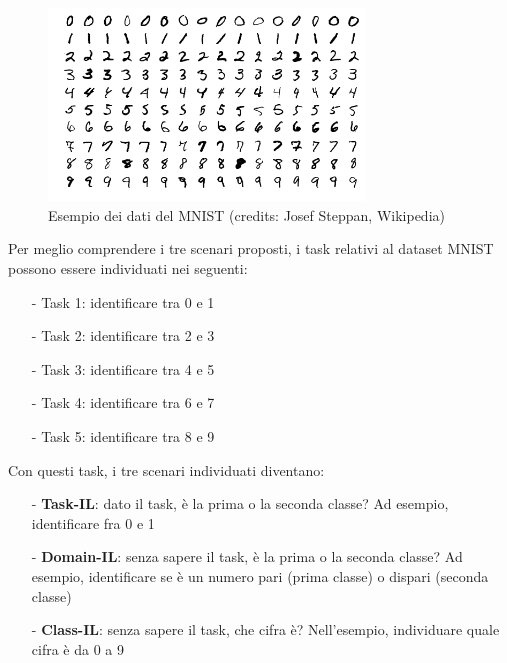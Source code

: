 \begin{figure}[h]
	\begin{center}
		\includegraphics[width=0.75\textwidth]{img/MnistExamples.png}
		\caption{Esempio dei dati del MNIST (credits: Josef Steppan, Wikipedia)}
		\label{fig:mnistexamples}
	\end{center}
\end{figure}
\pagebreak

Per meglio comprendere i tre scenari proposti, i task relativi al dataset MNIST possono essere individuati nei seguenti:
\begin{itemize}
    \item[-] Task 1: identificare tra 0 e 1
    \item[-] Task 2: identificare tra 2 e 3
    \item[-] Task 3: identificare tra 4 e 5
    \item[-] Task 4: identificare tra 6 e 7
    \item[-] Task 5: identificare tra 8 e 9
\end{itemize}
Con questi task, i tre scenari individuati diventano:
\begin{itemize}
    \item[-] \textbf{Task-IL}: dato il task, è la prima o la seconda classe? Ad esempio, identificare fra 0 e 1
    \item[-] \textbf{Domain-IL}: senza sapere il task, è la prima o la seconda classe? Ad esempio, identificare se è un numero pari (prima classe) o dispari (seconda classe)
    \item[-] \textbf{Class-IL}: senza sapere il task, che cifra è? Nell'esempio, individuare quale cifra è da 0 a 9
\end{itemize}
